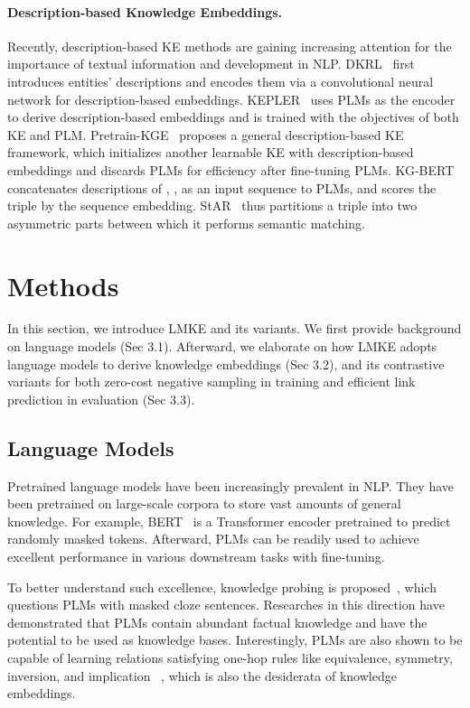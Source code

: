 \documentclass{article}
\begin{document}
\paragraph{\textbf{Description-based Knowledge Embeddings.}}  
Recently, description-based KE methods are gaining increasing attention for the importance of textual information and development in NLP.
DKRL~\cite{xie2016dkrl} first introduces entities' descriptions and encodes them via a convolutional neural network for description-based embeddings. 
KEPLER~\cite{wang2019kepler} uses PLMs as the encoder to derive description-based embeddings and is trained with the objectives of both KE and PLM.
Pretrain-KGE~\cite{zhang2020pretrainkge} proposes a general description-based KE framework, which initializes another learnable KE with description-based embeddings and discards PLMs for efficiency after fine-tuning PLMs.
KG-BERT~\cite{yao2019kgbert} concatenates descriptions of , ,  as an input sequence to PLMs, and scores the triple by the sequence embedding.
StAR~\cite{wang2021star} thus partitions a triple into two asymmetric parts
between which it performs semantic matching. 





\section{Methods}
In this section, we introduce LMKE and its variants.
We first provide background on language models (Sec 3.1). 
Afterward, we elaborate on how LMKE adopts language models to derive knowledge embeddings (Sec 3.2), 
and its contrastive variants for both zero-cost negative sampling  in training and efficient link prediction in evaluation (Sec 3.3).


\subsection{Language Models}
Pretrained language models have been increasingly prevalent in NLP. 
They have been pretrained on large-scale corpora to store vast amounts of general knowledge. 
For example, BERT~\cite{devlin2018bert} is a Transformer encoder pretrained to predict randomly masked tokens.
Afterward, PLMs can be readily used to achieve excellent performance in various downstream tasks with fine-tuning. 


To better understand such excellence, knowledge probing is proposed~\cite{petroni2019lama}, which questions PLMs with masked cloze sentences. Researches in this direction have demonstrated that PLMs contain abundant factual knowledge and have the potential to be used as knowledge bases. 
Interestingly, PLMs are also shown to be capable of learning relations satisfying one-hop rules like equivalence, symmetry, inversion, and implication ~\cite{kassner-etal-2020-symbolic}, which is also the desiderata of knowledge embeddings.
\end{document}
